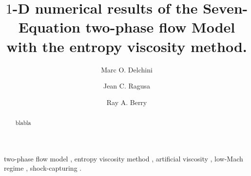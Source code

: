 \documentclass[preprint,10pt]{elsarticle}
\begin{document}
\begin{frontmatter}


\title{$1$-D numerical results of the Seven-Equation two-phase flow Model with the entropy viscosity method.}
\author{Marc O. Delchini}

\author{Jean C. Ragusa}

\author{Ray A. Berry}

\address[label1]{Department of Nuclear Engineering, Texas A\&M University, College Station, TX 77843, USA }

\address[label2]{Idaho National Laboratory, Idaho Falls, ID 83415, USA }

\begin{abstract}
blabla
\end{abstract}
\begin{keyword}
  two-phase flow model \sep 
	entropy viscosity method \sep 
	artificial viscosity \sep 
	low-Mach regime \sep 
	shock-capturing .
\end{keyword}
\end{frontmatter}
\linenumbers

\end{document}

